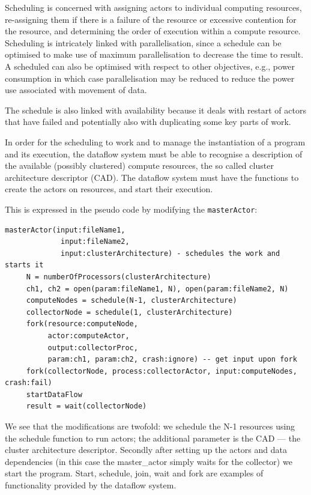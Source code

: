 \documentclass[11pt,a4paper]{article}
\begin{document}
Scheduling is concerned with assigning actors to individual computing
resources, re-assigning them if there is a failure of the resource or
excessive contention for the resource, and determining the order of
execution within a compute resource. Scheduling is intricately linked
with parallelisation, since a schedule can be optimised to make use of
maximum parallelisation to decrease the time to result. A scheduled
can also be optimised with respect to other objectives, e.g., power
consumption in which case parallelisation may be reduced to reduce the
power use associated with movement of data. 

The schedule is also linked with availability because it deals with
restart of actors that have failed and potentially also with
duplicating some key parts of work.

In order for the scheduling to work and to manage the instantiation of
a program and its execution, the dataflow system must be able to
recognise a description of the available (possibly clustered) compute
resources, the so called cluster architecture descriptor (CAD).  The
dataflow system must have the functions to create the actors on
resources, and start their execution.

\begin{Example}

This is expressed in the pseudo code by modifying the {\tt masterActor}:

\begin{lstlisting}
masterActor(input:fileName1, 
             input:fileName2, 
             input:clusterArchitecture) - schedules the work and starts it
     N = numberOfProcessors(clusterArchitecture)
     ch1, ch2 = open(param:fileName1, N), open(param:fileName2, N)
     computeNodes = schedule(N-1, clusterArchitecture)
     collectorNode = schedule(1, clusterArchitecture)
     fork(resource:computeNode, 
          actor:computeActor, 
          output:collectorProc,
          param:ch1, param:ch2, crash:ignore) -- get input upon fork
     fork(collectorNode, process:collectorActor, input:computeNodes, crash:fail)
     startDataFlow
     result = wait(collectorNode)
\end{lstlisting}

We see that the modifications are twofold: we schedule the N-1
resources using the schedule function to run actors; the additional
parameter is the CAD --- the cluster architecture descriptor.
Secondly after setting up the actors and data dependencies (in this
case the master\_actor simply waits for the collector) we start the
program.  Start, schedule, join, wait and fork are examples of
functionality provided by the dataflow system.

\end{Example}
\end{document}
